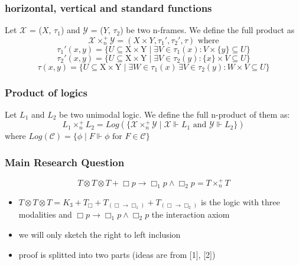 \documentclass[hyperref={pdfpagelabels=false},t,10pt]{beamer}
\begin{document}
\begin{frame}
  \frametitle{horizontal, vertical and standard functions}
  \begin{definition}
    Let $\mathcal{X}$ = ($X$, $\tau_1$) and $\mathcal{Y}$ = ($Y$, $\tau_2$) be two n-frames. We define the full product as
      $$\mathcal{X} \times_n^+  \mathcal{Y} = (X \times Y, \tau_1', \tau_2', \tau) \text{ where}$$
      $$ \tau_1'(x,y) = \{ U \subseteq \mbox{X} \times \mbox{Y} \mid \exists V \in \tau_1(x) : V \times  \{ y \} \subseteq U \}$$
      $$ \tau_2'(x,y) = \{ U \subseteq \mbox{X} \times \mbox{Y} \mid \exists V \in \tau_2(y) : \{ x \} \times V \subseteq U \}$$
          $$ \tau(x,y) = \{ U \subseteq \mbox{X} \times \mbox{Y} \mid \exists W \in \tau_1(x) \, \exists V \in \tau_2(y) : W \times V \subseteq U \}$$      
  \end{definition}

\end{frame}

\begin{frame}
  \frametitle{Product of logics }
  \begin{definition}
    Let $L_1$ and $L_2$ be two unimodal logic. We define the full n-product of them as:
    $$L_1 \times_n^+ L_2 =  Log(\{\mathcal{X} \times_n^+ \mathcal{Y} \mid \mathcal{X} \Vdash L_1 \text{ and } \mathcal{Y} \Vdash L_2 \})$$   
    where $Log(\mathcal{C}) = \{\phi \mid F \Vdash \phi \text{ for } F \in \mathcal{C}\}$
  \end{definition}


\end{frame}

\begin{frame}
  \frametitle{Main Research Question}
    \begin{theorem}
      $$T \otimes T \otimes T + \Box p \rightarrow \Box_1 p \land \Box_2 p = T \times_n^+ T$$
          \end{theorem}\pause


  \begin{itemize}
    \item $T \otimes T \otimes T = K_3 + T_{\Box} + T_{(\Box \rightarrow \Box_1)} + T_{(\Box \rightarrow \Box_2)}$ is the logic with three modalities 
      and $\Box p \rightarrow \Box_1 p \land \Box_2 p$ the interaction axiom \pause
    \item we will only sketch the right to left inclusion
    \item proof is splitted into two parts (ideas are from [1], [2])
  \end{itemize}
\end{frame}
\end{document}
